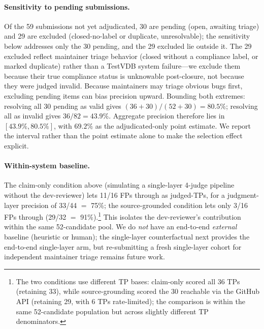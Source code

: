 \documentclass[sigconf]{acmart}
\begin{document}
\paragraph{Sensitivity to pending submissions.} Of the 59 submissions not yet adjudicated, 30 are pending (open, awaiting triage) and 29 are excluded (closed-no-label or duplicate, unresolvable); the sensitivity below addresses only the 30 pending, and the 29 excluded lie outside it. The 29 excluded reflect maintainer triage behavior (closed without a compliance label, or marked duplicate) rather than a TestVDB system failure---we exclude them because their true compliance status is unknowable post-closure, not because they were judged invalid. Because maintainers may triage obvious bugs first, excluding pending items can bias precision upward. Bounding both extremes: resolving all 30 pending as valid gives $(36{+}30)/(52{+}30)=80.5\%$; resolving all as invalid gives $36/82=43.9\%$. Aggregate precision therefore lies in $[43.9\%, 80.5\%]$, with $69.2\%$ as the adjudicated-only point estimate. We report the interval rather than the point estimate alone to make the selection effect explicit.

\paragraph{Within-system baseline.} The claim-only condition above (simulating a single-layer 4-judge pipeline without the dev-reviewer) lets 11/16 FPs through as judged-TPs, for a judgment-layer precision of 33/44 $=$ 75\%; the source-grounded condition lets only 3/16 FPs through (29/32 $=$ 91\%).\footnote{The two conditions use different TP bases: claim-only scored all 36 TPs (retaining 33), while source-grounding scored the 30 reachable via the GitHub API (retaining 29, with 6 TPs rate-limited); the comparison is within the same 52-candidate population but across slightly different TP denominators.} This isolates the dev-reviewer's contribution within the same 52-candidate pool. We do \emph{not} have an end-to-end \emph{external} baseline (heuristic or human); the single-layer counterfactual next provides the end-to-end single-layer arm, but re-submitting a fresh single-layer cohort for independent maintainer triage remains future work.
\end{document}
